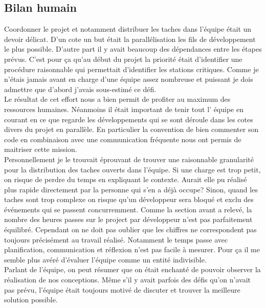 \documentclass[10pt,a4paper]{book}
\begin{document}
\subsection{Bilan humain}
Coordonner le projet et notamment distribuer les taches dans l'équipe était un devoir délicat. D'un cote un but était la parallélisation les fils de développement le plus possible. D'autre part il y avait beaucoup des dépendances entre les étapes prévus. C'est pour ça qu'au début du projet la priorité était d'identifier une procédure raisonnable qui permettait d'identifier les stations critiques. Comme je n'étais jamais avant en charge d'une équipe assez nombreuse et puissant je dois admettre que d'abord j'avais sous-estimé ce défi.\\ Le résultat de cet effort nous a bien permit de profiter au maximum des ressources humaines. Néanmoins il était important de tenir tout l' équipe en courant en ce que regarde les développements qui se sont déroule dans les cotes divers du projet en parallèle. En particulier la convention de bien commenter son code en combinaison avec une communication fréquente nous ont permis de maitriser cette mission.\\Personnellement je le trouvait éprouvant de trouver une raisonnable granularité pour la distribution des taches ouverts dans l'équipe. Si une charge est trop petit, on risque de perdre du temps en expliquant le contexte. Aurait elle pu réalisé plus rapide directement par la personne qui s'en a déjà occupe? Sinon, quand les taches sont trop complexe on risque qu'un développeur sera bloqué et exclu des événements qui se passent concurremment. Comme la section avant a relevé, la nombre des heures passes sur le project par développeur n'est pas parfaitement équilibré. Cependant on ne doit pas oublier que les chiffres ne correspondent pas toujours précisément au travail réalisé. Notamment le temps passe avec planification, communication et réflexion n'est pas facile à mesurer. Pour ça il me semble plus avéré d'évaluer l'équipe comme un entité indivisible.\\
Parlant de l'équipe, on peut résumer que on était enchanté de pouvoir observer la réalisation de nos conceptions. Même s'il y avait parfois des défis qu'on n'avait pas prévu, l'équipe était toujours motivé de discuter et trouver la meilleure solution possible.
\end{document}
